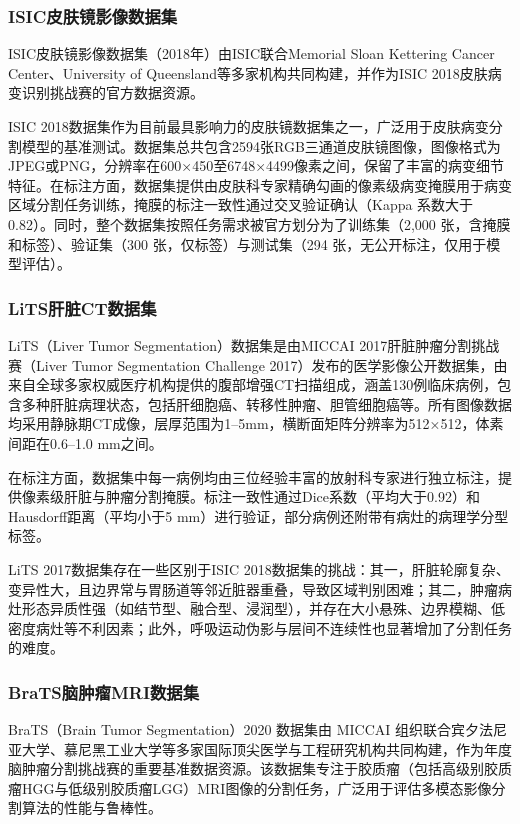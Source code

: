 \subsubsection{ISIC皮肤镜影像数据集}

ISIC皮肤镜影像数据集（2018年）由ISIC联合Memorial Sloan Kettering Cancer Center、University of Queensland等多家机构共同构建，并作为ISIC 2018皮肤病变识别挑战赛的官方数据资源\cite{codella2019skinlesionanalysismelanoma}。

ISIC 2018数据集作为目前最具影响力的皮肤镜数据集之一，广泛用于皮肤病变分割模型的基准测试。数据集总共包含2594张RGB三通道皮肤镜图像，图像格式为JPEG或PNG，分辨率在600×450至6748×4499像素之间，保留了丰富的病变细节特征。在标注方面，数据集提供由皮肤科专家精确勾画的像素级病变掩膜用于病变区域分割任务训练，掩膜的标注一致性通过交叉验证确认（Kappa 系数大于 0.82）。同时，整个数据集按照任务需求被官方划分为了训练集（2,000 张，含掩膜和标签）、验证集（300 张，仅标签）与测试集（294 张，无公开标注，仅用于模型评估）。

\subsubsection{LiTS肝脏CT数据集}

LiTS（Liver Tumor Segmentation）数据集是由MICCAI 2017肝脏肿瘤分割挑战赛（Liver Tumor Segmentation Challenge 2017）发布的医学影像公开数据集，由来自全球多家权威医疗机构提供的腹部增强CT扫描组成，涵盖130例临床病例，包含多种肝脏病理状态，包括肝细胞癌、转移性肿瘤、胆管细胞癌等\cite{Bilic_2023}。所有图像数据均采用静脉期CT成像，层厚范围为1–5mm，横断面矩阵分辨率为512×512，体素间距在0.6–1.0 mm之间。

在标注方面，数据集中每一病例均由三位经验丰富的放射科专家进行独立标注，提供像素级肝脏与肿瘤分割掩膜。标注一致性通过Dice系数（平均大于0.92）和Hausdorff距离（平均小于5 mm）进行验证，部分病例还附带有病灶的病理学分型标签。

LiTS 2017数据集存在一些区别于ISIC 2018数据集的挑战：其一，肝脏轮廓复杂、变异性大，且边界常与胃肠道等邻近脏器重叠，导致区域判别困难；其二，肿瘤病灶形态异质性强（如结节型、融合型、浸润型），并存在大小悬殊、边界模糊、低密度病灶等不利因素；此外，呼吸运动伪影与层间不连续性也显著增加了分割任务的难度。

\subsubsection{BraTS脑肿瘤MRI数据集}

BraTS（Brain Tumor Segmentation）2020 数据集由 MICCAI 组织联合宾夕法尼亚大学、慕尼黑工业大学等多家国际顶尖医学与工程研究机构共同构建，作为年度脑肿瘤分割挑战赛的重要基准数据资源\cite{menze2015}。该数据集专注于胶质瘤（包括高级别胶质瘤HGG与低级别胶质瘤LGG）MRI图像的分割任务，广泛用于评估多模态影像分割算法的性能与鲁棒性。

